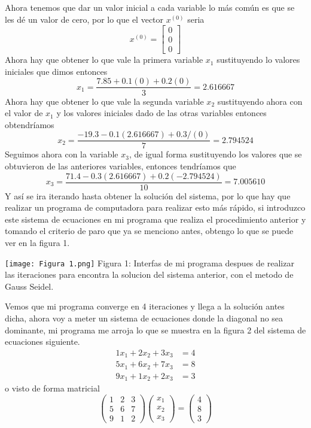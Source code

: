 \documentclass[12pt]{article}
\begin{document}
			Ahora tenemos que dar un valor inicial a cada variable lo más común es que se les dé un valor de cero, por lo que 
			el vector $ x^{(0)} $ seria
			$$
			x^{(0)} =
			\left[\begin{array}{c}
				0 \\
				0 \\
				0 
			\end{array}\right]
			$$
			Ahora hay que obtener lo que vale la primera variable $ x_1 $ sustituyendo lo valores iniciales que dimos entonces
			$$ x_1 = \frac{7.85 + 0.1(0) + 0.2(0)}{3} = 2.616667 $$
			Ahora hay que obtener lo que vale la segunda variable $ x_2 $ sustituyendo ahora con el valor de $ x_1 $ y los valores 
			iniciales dado de las otras variables entonces obtendríamos
			$$ x_2 = \frac{-19.3 - 0.1(2.616667) + 0.3/(0)}{7} = 2.794524 $$
			Seguimos ahora con la variable $ x_3 $, de igual forma sustituyendo los valores que se obtuvieron de las anteriores 
			variables, entonces tendríamos que
			$$ x_3 = \frac{71.4 - 0.3(2.616667) + 0.2(-2.794524)}{10} = 7.005610 $$
			Y así se ira iterando hasta obtener la solución del sistema, por lo que hay que realizar un programa de computadora para 
			realizar esto más rápido, si introduzco este sistema de ecuaciones en mi programa que realiza el procedimiento anterior y 
			tomando el criterio de paro que ya se menciono antes, obtengo lo que se puede ver en la figura 1.
			\begin{center}
				\texttt{[image: Figura 1.png]}
				Figura 1: Interfas de mi programa despues de realizar las iteraciones para encontra la solucion del sistema anterior, con el metodo de Gauss Seidel.
			\end{center}
			Vemos que mi programa converge en 4 iteraciones y llega a la solución antes dicha, ahora voy a meter un sistema de ecuaciones 
			donde la diagonal no sea dominante, mi programa me arroja lo que se muestra en la figura 2 del sistema de ecuaciones siguiente.
			\begin{align*}
				1x_1 + 2x_2 + 3x_3 &= 4 \\
				5x_1 + 6x_2 + 7x_3 &= 8 \\
				9x_1 + 1x_2 + 2x_3 &= 3
			\end{align*}
			o visto de forma matricial
			$$
			\left(\begin{array}{ccc}
				1 & 2 & 3 \\
				5 & 6 & 7 \\
				9 & 1 & 2
			\end{array}\right)
			\left(\begin{array}{c}
				x_1 \\
				x_2 \\
				x_3 
			\end{array}\right)
			   =
			\left(\begin{array}{c}
			 4 \\
			 8 \\
			 3 
			\end{array}\right)
			$$
\end{document}
